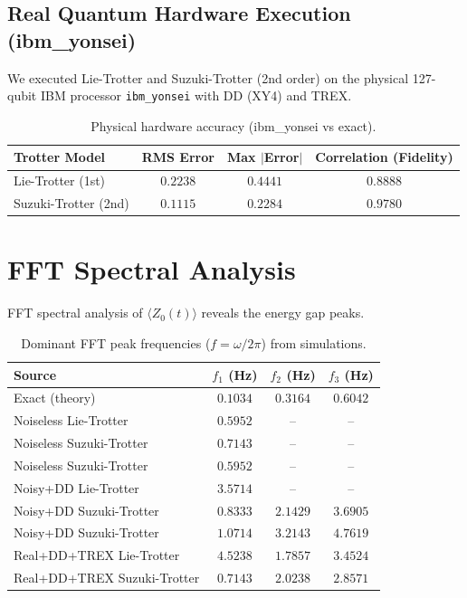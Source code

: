 \documentclass[11pt,a4paper]{article}
\begin{document}
\subsection{Real Quantum Hardware Execution (ibm\_yonsei)}

We executed Lie-Trotter and Suzuki-Trotter (2nd order) on the physical 127-qubit IBM processor \texttt{ibm\_yonsei} with DD (XY4) and TREX. 


\begin{table}[H]
\centering
\caption{Physical hardware accuracy (ibm\_yonsei vs exact).}
\label{tab:real_metrics}
\begin{tabular}{lccc}
\toprule
Trotter Model & RMS Error & Max $|$Error$|$ & Correlation (Fidelity) \\
\midrule
Lie-Trotter (1st) & $0.2238$ & $0.4441$ & $0.8888$ \\
Suzuki-Trotter (2nd) & $0.1115$ & $0.2284$ & $0.9780$ \\
\bottomrule
\end{tabular}
\end{table}
\section{FFT Spectral Analysis}

FFT spectral analysis of $\langle Z_0(t) \rangle$ reveals the energy gap peaks.

\begin{table}[H]
\centering
\caption{Dominant FFT peak frequencies ($f = \omega / 2\pi$) from simulations.}
\label{tab:fft_peaks}
\begin{tabular}{lccc}
\toprule
Source & $f_1$ (Hz) & $f_2$ (Hz) & $f_3$ (Hz) \\
\midrule
Exact (theory) & $0.1034$ & $0.3164$ & $0.6042$ \\
Noiseless Lie-Trotter & $0.5952$ & -- & -- \\
Noiseless Suzuki-Trotter & $0.7143$ & -- & -- \\
Noiseless Suzuki-Trotter & $0.5952$ & -- & -- \\
Noisy+DD Lie-Trotter & $3.5714$ & -- & -- \\
Noisy+DD Suzuki-Trotter & $0.8333$ & $2.1429$ & $3.6905$ \\
Noisy+DD Suzuki-Trotter & $1.0714$ & $3.2143$ & $4.7619$ \\
Real+DD+TREX Lie-Trotter & $4.5238$ & $1.7857$ & $3.4524$ \\
Real+DD+TREX Suzuki-Trotter & $0.7143$ & $2.0238$ & $2.8571$ \\
\bottomrule
\end{tabular}
\end{table}
\end{document}
